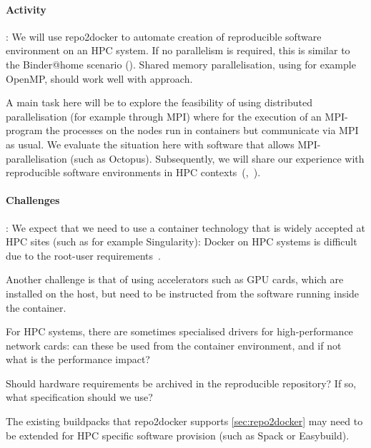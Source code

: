 \begin{task}
\paragraph*{Activity}: We will use repo2docker to automate creation of
reproducible software environment on an HPC system. If no parallelism is
required, this is similar to the Binder@home scenario
(). Shared memory parallelisation, using for
example OpenMP, should work well with approach.

A main task here will be to explore the feasibility of using distributed
parallelisation (for example through MPI) where for the execution of an
MPI-program the processes on the nodes run in containers but communicate via MPI
as usual. We evaluate the situation here with software that allows
MPI-parallelisation (such as Octopus). Subsequently, we will share our experience with
reproducible software environments in HPC
contexts~(,~).

\paragraph*{Challenges}: We expect that we need to use a container technology
that is widely accepted at HPC sites (such as for example Singularity): Docker
on HPC systems is difficult due to the root-user requirements~\cite{Gerhardt_2017}.

Another challenge is that of using accelerators such as GPU cards, which are
installed on the host, but need to be instructed from the software running
inside the container.

For HPC systems, there are sometimes specialised drivers for high-performance
network cards: can these be used from the container environment, and if not what
is the performance impact?  \cite{Liu2021}

Should hardware requirements be archived in the reproducible repository? If so,
what specification should we use?

The existing buildpacks that repo2docker supports
\ref{sec:repo2docker} may need to be extended for
HPC specific software provision (such as Spack or Easybuild).


\end{task}





